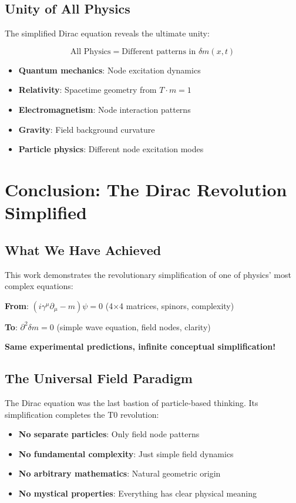 \documentclass[12pt,a4paper]{article}
\newcommand{\deltam}{\delta m}
\theoremstyle{definition}
\theoremstyle{remark}
\begin{document}
	\subsection{Unity of All Physics}
	
	The simplified Dirac equation reveals the ultimate unity:
	
	\begin{equation}
		\text{All Physics} = \text{Different patterns in } \deltam(x,t)
	\end{equation}
	
	\begin{itemize}
		\item \textbf{Quantum mechanics}: Node excitation dynamics
		\item \textbf{Relativity}: Spacetime geometry from $T \cdot m = 1$
		\item \textbf{Electromagnetism}: Node interaction patterns
		\item \textbf{Gravity}: Field background curvature
		\item \textbf{Particle physics}: Different node excitation modes
	\end{itemize}
	
	\section{Conclusion: The Dirac Revolution Simplified}
	
	\subsection{What We Have Achieved}
	
	This work demonstrates the revolutionary simplification of one of physics' most complex equations:
	
	\begin{center}
		\textbf{From}: $(i\gamma^{\mu}\partial_{\mu} - m)\psi = 0$ (4×4 matrices, spinors, complexity)
		
		\textbf{To}: $\partial^2 \deltam = 0$ (simple wave equation, field nodes, clarity)
	\end{center}
	
	\textbf{Same experimental predictions, infinite conceptual simplification!}
	
	\subsection{The Universal Field Paradigm}
	
	The Dirac equation was the last bastion of particle-based thinking. Its simplification completes the T0 revolution:
	
	\begin{itemize}
		\item \textbf{No separate particles}: Only field node patterns
		\item \textbf{No fundamental complexity}: Just simple field dynamics
		\item \textbf{No arbitrary mathematics}: Natural geometric origin
		\item \textbf{No mystical properties}: Everything has clear physical meaning
	\end{itemize}
	
\end{document}
